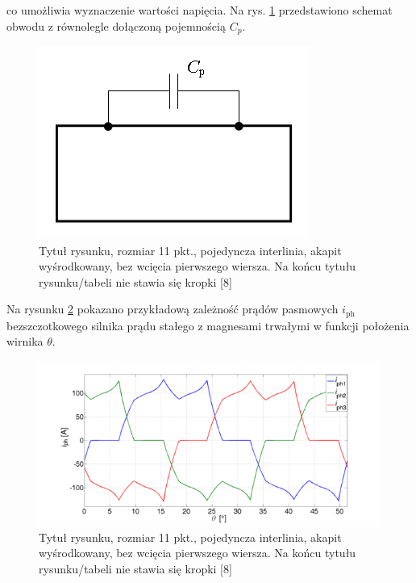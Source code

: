 \documentclass[12pt,twoside]{mwart}
\begin{document}
\begin{example}
[\ldots] co umożliwia wyznaczenie wartości napięcia. Na rys. \ref{Fig:schemat} przedstawiono schemat obwodu z równolegle dołączoną pojemnością $C_p$.
\end{example}

\begin{figure}[h]
	\centering
	\includegraphics{figures/fig1}
	\caption{Tytuł rysunku, rozmiar 11 pkt., pojedyncza interlinia, akapit wyśrodkowany, bez wcięcia pierwszego wiersza. Na końcu tytułu rysunku/tabeli nie stawia się kropki [8]}
\label{Fig:schemat}
\end{figure}

\begin{example}
[\ldots] Na rysunku \ref{Fig:wykres} pokazano przykładową zależność prądów pasmowych $i_\mathrm{ph}$ bezszczotkowego silnika prądu stałego z magnesami trwałymi w funkcji położenia wirnika $\theta$.
\end{example}

\begin{figure}[h]
	\centering
	\includegraphics{figures/fig2}
	\caption{Tytuł rysunku, rozmiar 11 pkt., pojedyncza interlinia, akapit wyśrodkowany, bez wcięcia pierwszego wiersza. Na końcu tytułu rysunku/tabeli nie stawia się kropki [8]}
\label{Fig:wykres}
\end{figure}
\end{document}
